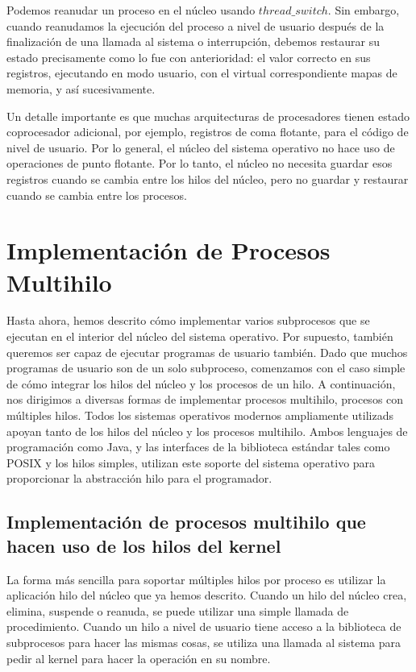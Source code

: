 \documentclass[10pt]{book}
\begin{document}
Podemos reanudar un proceso en el núcleo usando $thread\_ switch$. Sin embargo, cuando reanudamos la ejecución del proceso a nivel de usuario después de la finalización de una llamada al sistema o interrupción, debemos restaurar su estado precisamente como lo fue con anterioridad: el valor correcto en sus registros, ejecutando en modo usuario, con el virtual correspondiente mapas de memoria, y así sucesivamente.

Un detalle importante es que muchas arquitecturas de procesadores tienen estado coprocesador adicional, por ejemplo, registros de coma flotante, para el código de nivel de usuario. Por lo general, el núcleo del sistema operativo no hace uso de operaciones de punto flotante. Por lo tanto, el núcleo no necesita guardar esos registros cuando se cambia entre los hilos del núcleo, pero no guardar y restaurar cuando se cambia entre los procesos.

\section{Implementación de Procesos Multihilo}
Hasta ahora, hemos descrito cómo implementar varios subprocesos que se ejecutan en el interior del núcleo del sistema operativo. Por supuesto, también queremos ser capaz de ejecutar programas de usuario también. Dado que muchos programas de usuario son de un solo subproceso, comenzamos con el caso simple de cómo integrar los hilos del núcleo y los procesos de un hilo. A continuación, nos dirigimos a diversas formas de implementar procesos multihilo, procesos con múltiples hilos. Todos los sistemas operativos modernos ampliamente utilizads apoyan tanto de los hilos del núcleo y los procesos multihilo. Ambos lenguajes de programación como Java, y las interfaces de la biblioteca estándar tales como POSIX y los hilos simples, utilizan este soporte del sistema operativo para proporcionar la abstracción hilo para el programador.

\subsection{Implementación de procesos multihilo que hacen uso de los hilos del kernel}
La forma más sencilla para soportar múltiples hilos por proceso es utilizar la aplicación hilo del núcleo que ya hemos descrito. Cuando un hilo del núcleo crea, elimina, suspende o reanuda, se puede utilizar una simple llamada de procedimiento. Cuando un hilo a nivel de usuario tiene acceso a la biblioteca de subprocesos para hacer las mismas cosas, se utiliza una llamada al sistema para pedir al kernel para hacer la operación en su nombre.
\end{document}
